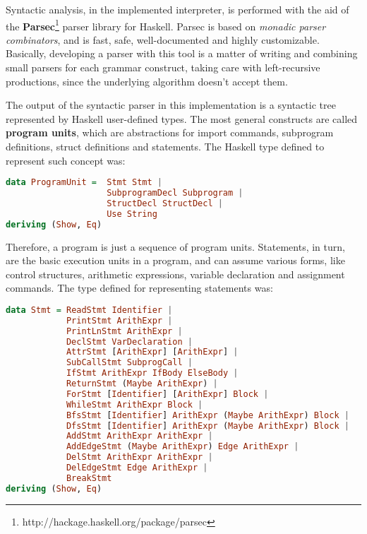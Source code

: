 Syntactic analysis, in the implemented interpreter, is performed
with the aid of the \textbf{Parsec}\footnote{http://hackage.haskell.org/package/parsec} 
parser library for Haskell.
Parsec is based on \emph{monadic parser combinators}, and is
fast, safe, well-documented and highly customizable. Basically,
developing a parser with this tool is a matter of writing and combining small parsers
for each grammar construct, taking care with left-recursive
productions, since the underlying algorithm doesn't 
accept them.

The output of the syntactic parser in this implementation is a syntactic tree
represented by Haskell user-defined types. The most general constructs are called
\textbf{program units}, which are abstractions for import commands, subprogram definitions,
struct definitions and statements. The Haskell type defined to represent such
concept was:

\begin{lstlisting}[language=Haskell,basicstyle=\footnotesize]
data ProgramUnit =  Stmt Stmt | 
                    SubprogramDecl Subprogram |
                    StructDecl StructDecl |
                    Use String 
deriving (Show, Eq)
\end{lstlisting}

Therefore, a program is just a sequence of program units. Statements, in turn,
are the basic execution units in a program, and can assume various forms,
like control structures, arithmetic expressions, variable declaration and
assignment commands. The type defined for representing statements was:

\begin{lstlisting}[language=Haskell,basicstyle=\footnotesize]
data Stmt = ReadStmt Identifier | 
            PrintStmt ArithExpr | 
            PrintLnStmt ArithExpr | 
            DeclStmt VarDeclaration | 
            AttrStmt [ArithExpr] [ArithExpr] |
            SubCallStmt SubprogCall |
            IfStmt ArithExpr IfBody ElseBody |
            ReturnStmt (Maybe ArithExpr) |
            ForStmt [Identifier] [ArithExpr] Block |
            WhileStmt ArithExpr Block |
            BfsStmt [Identifier] ArithExpr (Maybe ArithExpr) Block |
            DfsStmt [Identifier] ArithExpr (Maybe ArithExpr) Block |
            AddStmt ArithExpr ArithExpr |
            AddEdgeStmt (Maybe ArithExpr) Edge ArithExpr |
            DelStmt ArithExpr ArithExpr |
            DelEdgeStmt Edge ArithExpr |
            BreakStmt 
deriving (Show, Eq) 
\end{lstlisting}

